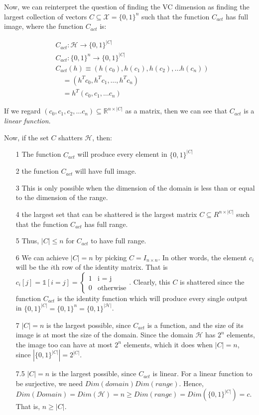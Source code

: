 \documentclass[11pt]{article}
\renewcommand{\H}{\ensuremath{\mathcal{H}}}
\newcommand{\X}{\ensuremath{\mathcal{X}}}
\begin{document}
Now, we can reinterpret the question of finding the VC dimension as finding
the largest collection of vectors $C \subseteq \X = \{0, 1\}^n$ such that
the function $C_{act}$ has full image, where the function $C_{act}$ is:

\begin{align*}
&C_{act}: \H \rightarrow \{0, 1\}^{|C|} \\
&C_{act}: \{0, 1\}^n \rightarrow \{0, 1\}^|C| \\
&C_{act}(h) \equiv (h(c_0), h(c_1), h(c_2), \dots h(c_n)) \\
&\quad = (h^T c_0, h^T c_1, \dots, h^T c_n) \\
& \quad = h^T (c_0, c_1, \dots c_n)
\end{align*}

If we regard $(c_0, c_1, c_2, \dots c_n) \subseteq \mathbb R^{n \times |C|}$
as a matrix, then we can see that  $C_{act}$ is a \emph{linear function}.


Now, if the set $C$ shatters $\H$, then:
\begin{itemize}
\item[1] The function $C_{act}$ will produce every element in $\{0, 1\}^{|C|}$
\item[2] the function $C_{act}$ will have full image. 
\item[3] This is  only possible when the dimension of the domain is less than or equal to the dimension of the range.
\item[4] the largest set that can be shattered is the largest matrix  $C \subseteq R^{n \times |C|}$  
         such that the function $C_{act}$ has full range.
\item[5] Thus, $|C| \leq n$ for $C_{act}$ to have full range.
\item[6] We can achieve $|C| = n$ by picking $C = I_{n \times n}$. In other words,
          the element $c_i$ will be the $i$th row of the identity matrix. That
          is $c_i[j] = \mathbb{1}[i = j] = \begin{cases} 1 & \text{i = j} \\ 0 & \text{otherwise} \end{cases}$.
         Clearly, this $C$ is shattered since the function $C_{act}$ is the identity function which
         will produce every single output in $\{0, 1\}^{|C|} = \{0, 1\}^n = \{0, 1\}^{|\H|}$.         
\item[7] $|C|=n$ is the largest possible, since $C_{act}$ is a function, and
         the size of its image is at most the size of the domain. Since the domain $\H$
         has $2^n$ elements, the image too can have at most $2^n$ elements, which
         it does when $|C| = n$, since $|\{0, 1\}^{|C|}| = 2^{|C|}$.
\item[7.5] $|C|=n$ is the largest possible, since $C_{act}$ is linear.
            For a linear function to be surjective, we need $Dim(domain)  Dim(range)$.
            Hence, $Dim(Domain) = Dim(\H) = n \geq Dim(range) = Dim(\{0, 1\}^{|C|}) = c$.
            That is, $n \geq |C|$.
\end{itemize}
\end{document}
